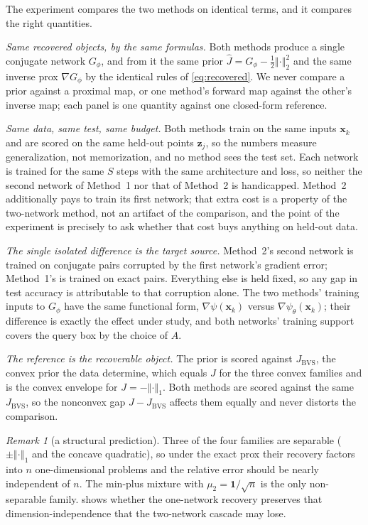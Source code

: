 \documentclass[11pt]{article}
\theoremstyle{definition}
\theoremstyle{remark}
\newtheorem*{remark}{Remark}
\newcommand{\normsq}[1]{\left\Vert{#1} \right\Vert_{2}^{2}}
\newcommand{\normone}[1]{\left\Vert{#1} \right\Vert_{1}}
\def\bx {\boldsymbol{x}}
\def\bz {\boldsymbol{z}}
\def\JBVS {J_{\text{BVS}}}
\def\psiNN {\psi_{\theta}}
\def\GNN {G_{\phi}}
\begin{document}
The experiment compares the two methods on identical terms, and it compares the right quantities.

\emph{Same recovered objects, by the same formulas.}
Both methods produce a single conjugate network $\GNN$, and from it the same prior $\hat{J} = \GNN - \tfrac12\normsq{\cdot}$ and the same inverse prox $\nabla\GNN$ by the identical rules of \cref{eq:recovered}.
We never compare a prior against a proximal map, or one method's forward map against the other's inverse map; each panel is one quantity against one closed-form reference.

\emph{Same data, same test, same budget.}
Both methods train on the same inputs $\bx_{k}$ and are scored on the same held-out points $\bz_{j}$, so the numbers measure generalization, not memorization, and no method sees the test set.
Each network is trained for the same $S$ steps with the same architecture and loss, so neither the second network of Method~1 nor that of Method~2 is handicapped.
Method~2 additionally pays to train its first network; that extra cost is a property of the two-network method, not an artifact of the comparison, and the point of the experiment is precisely to ask whether that cost buys anything on held-out data.

\emph{The single isolated difference is the target source.}
Method~2's second network is trained on conjugate pairs corrupted by the first network's gradient error; Method~1's is trained on exact pairs.
Everything else is held fixed, so any gap in test accuracy is attributable to that corruption alone.
The two methods' training inputs to $\GNN$ have the same functional form, $\nabla\psi(\bx_{k})$ versus $\nabla\psiNN(\bx_{k})$; their difference is exactly the effect under study, and both networks' training support covers the query box by the choice of $A$.

\emph{The reference is the recoverable object.}
The prior is scored against $\JBVS$, the convex prior the data determine, which equals $J$ for the three convex families and is the convex envelope for $J = -\normone{\cdot}$.
Both methods are scored against the same $\JBVS$, so the nonconvex gap $J - \JBVS$ affects them equally and never distorts the comparison.

\begin{remark}[a structural prediction]
Three of the four families are separable ($\pm\normone{\cdot}$ and the concave quadratic), so under the exact prox their recovery factors into $n$ one-dimensional problems and the relative error should be nearly independent of $n$.
The min-plus mixture with $\mu_{2} = \bm{1}/\sqrt{n}$ is the only non-separable family.
 shows whether the one-network recovery preserves that dimension-independence that the two-network cascade may lose.
\end{remark}
\end{document}
